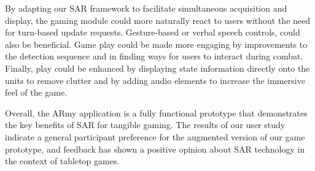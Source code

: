 By adapting our SAR framework to facilitate
simultaneous acquisition and display, the gaming module could more
naturally react
to users without the need for turn-based update requests.
Gesture-based or verbal speech controls, could also be beneficial.
Game play could be made more engaging by improvements to the detection
sequence and in finding ways for users to interact during combat.
%
Finally, play could be enhanced by displaying state information
directly onto the units to remove clutter and by adding audio
elements to increase the immersive feel of the game.

Overall, the ARmy application is a fully functional prototype that
demonstrates the key benefits of SAR for tangible gaming.
The results of our user study indicate a general participant
preference for the augmented version of our game prototype, and
feedback has shown a positive opinion about SAR technology in the
context of tabletop games.

